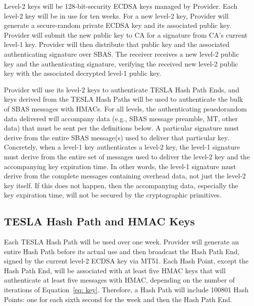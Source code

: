 \documentclass[letterpaper,times]{IONconf/IONconf}
\begin{document}
		Level-2 keys will be 128-bit-security ECDSA keys managed by Provider.
		Each level-2 key will be in use for ten weeks.
		For a new level-2 key, Provider will generate a secure-random private ECDSA key and its associated public key.
		Provider will submit the new public key to CA for a signature from CA's current level-1 key.
		Provider will then distribute that public key and the associated authenticating signature over SBAS.
		The receiver receives a new level-2 public key and the authenticating signature, verifying the received new level-2 public key with the associated decrypted level-1 public key.

		Provider will use its level-2 keys to authenticate TESLA Hash Path Ends, and keys derived from the TESLA Hash Paths will be used to authenticate the bulk of SBAS messages with HMACs.
		For all levels, the authenticating psuedorandom data delivered will accompany data (e.g., SBAS message preamble, MT, other data) that must be sent per the definitions below.
		A particular signature must derive from the entire SBAS message(s) used to deliver that particular key.
		Concretely, when a level-1 key authenticates a level-2 key, the level-1 signature must derive from the entire set of messages used to deliver the level-2 key and the accompanying key expiration time. 
		In other words, the level-1 signature must derive from the complete messages containing overhead data, not just the level-2 key itself.
		If this does not happen, then the accompanying data, especially the key expiration time, will not be secured by the cryptographic primitives.

	\subsection{TESLA Hash Path and HMAC Keys} \label{sub:tesla_hash_path}

		Each TESLA Hash Path will be used over one week.
		Provider will generate an entire Hash Path before its actual use and then broadcast the Hash Path End, signed by the current level-2 ECDSA key via MT51.
		Each Hash Point, except the Hash Path End, will be associated with at least five HMAC keys that will authenticate at least five messages with HMAC, depending on the number of iterations of Equation~\eqref{eq: key}.
		Therefore, a Hash Path will include 100801 Hash Points: one for each sixth second for the week and then the Hash Path End.
\end{document}
